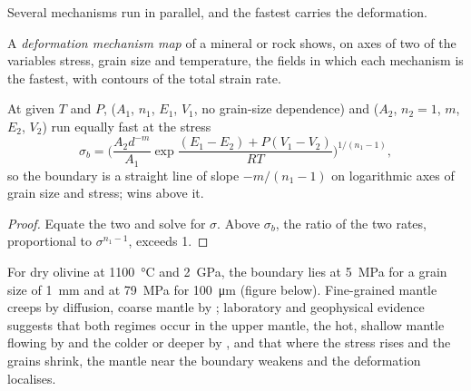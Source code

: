 Several mechanisms run in parallel, and the fastest carries the deformation.

\begin{definition}\label{def:b3:deformation-mechanisms:deformation-map}
A \emph{deformation mechanism map} of a
mineral or rock shows, on axes of two of the variables stress, grain size and
temperature, the fields in which each mechanism is the fastest, with contours
of the total strain rate.
\end{definition}

\begin{proposition}\label{prop:b3:deformation-mechanisms:boundary}
At given $T$ and $P$,  ($A_1$, $n_1$, $E_1$, $V_1$, no
grain-size dependence) and  ($A_2$, $n_2 = 1$, $m$, $E_2$, $V_2$)
run equally fast at the stress
\[
  \sigma_b = \biggl(\frac{A_2d^{-m}}{A_1}
  \exp\frac{(E_1 - E_2) + P(V_1 - V_2)}{RT}\biggr)^{1/(n_1 - 1)} ,
\]
so the boundary is a straight line of slope $-m/(n_1 - 1)$ on logarithmic
axes of grain size and stress;  wins above it.
\end{proposition}

\begin{proof}
Equate the two  and solve for $\sigma$. Above $\sigma_b$, the ratio of
the two rates, proportional to $\sigma^{n_1 - 1}$, exceeds 1.
\end{proof}

For dry olivine at \qty{1100}{\celsius} and \qty{2}{GPa}, the boundary lies at
\qty{5}{MPa} for a grain size of \qty{1}{mm} and at \qty{79}{MPa} for
\qty{100}{\micro m} (figure below). Fine-grained mantle creeps by diffusion,
coarse mantle by ; laboratory and geophysical evidence suggests
that both regimes occur in the upper mantle, the hot, shallow mantle flowing by
 and the colder or deeper by , and that where
the stress rises and the grains shrink, the mantle near the boundary weakens
and the deformation localises.

